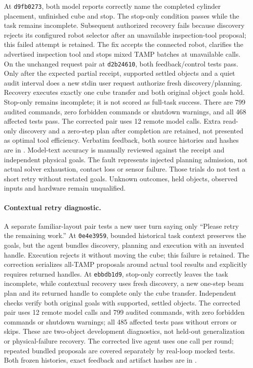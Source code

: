 At \texttt{d9fb0273}, both model reports correctly name the completed cylinder
placement, unfinished cube and stop. The stop-only condition passes while the
task remains incomplete. Subsequent authorized recovery fails because discovery
rejects its configured robot selector after an unavailable inspection-tool
proposal; this failed attempt is retained. The fix accepts the connected robot,
clarifies the advertised inspection tool and stops mixed TAMP batches at
unavailable calls. On the unchanged request pair at \texttt{d2b24610}, both
feedback/control tests pass. Only after the expected partial receipt, supported
settled objects and a quiet audit interval does a new stdin user request authorize
fresh discovery/planning. Recovery executes exactly one cube transfer and both
original object goals hold. Stop-only remains incomplete; it is not scored as
full-task success. There are 799 audited commands, zero forbidden commands or
shutdown warnings, and all 468 affected tests pass. The corrected pair uses
12 remote model calls. Extra read-only discovery and a zero-step plan after
completion are retained, not presented as optimal tool efficiency.
Verbatim feedback, both source histories and hashes are in
. Model-text accuracy is
manually reviewed against the receipt and independent physical goals. The fault
represents injected planning admission, not actual solver exhaustion, contact
loss or sensor failure. Those trials do not test a short retry without restated
goals. Unknown outcomes, held objects, observed inputs and hardware remain
unqualified.

\paragraph{Contextual retry diagnostic.}
A separate familiar-layout pair tests a new user turn saying only ``Please retry
the remaining work.'' At \texttt{0e4e3959}, bounded historical task context
preserves the goals, but the agent bundles discovery, planning and execution with
an invented handle. Execution rejects it without moving the cube; this failure
is retained. The correction serializes all-TAMP proposals around actual tool
results and explicitly requires returned handles. At \texttt{ebbdb1d9}, stop-only
correctly leaves the task incomplete, while contextual recovery uses fresh
discovery, a new one-step beam plan and its returned handle to complete only the
cube transfer. Independent checks verify both original goals with supported,
settled objects. The corrected pair uses 12 remote model calls and 799 audited
commands, with zero forbidden commands or shutdown warnings; all 485 affected
tests pass without errors or skips. These are two-object development diagnostics,
not held-out generalization or physical-failure recovery. The corrected live
agent uses one call per round; repeated bundled proposals are covered separately
by real-loop mocked tests. Both frozen histories, exact feedback and artifact
hashes are in .

